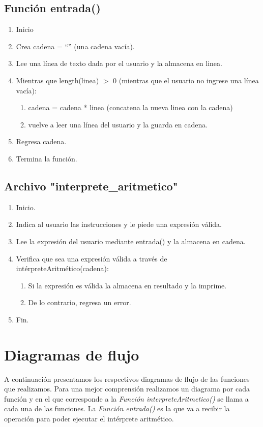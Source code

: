 \documentclass{article}
\begin{document}
\subsection{Función entrada()}
\begin{enumerate}
    \item Inicio
    \item Crea cadena  = “” (una cadena vacía).
    \item Lee una línea de texto dada por el usuario y la almacena en linea.
    \item Mientras que length(linea) $>$ 0    (mientras que el usuario no ingrese una línea vacía):
    \begin{enumerate}
        \item cadena  = cadena * linea  (concatena la nueva linea con la cadena)
        \item vuelve a leer una línea del usuario y la guarda en cadena.
    \end{enumerate}
    \item Regresa cadena.
    \item Termina la función.
\end{enumerate}

\subsection{Archivo "interprete\_aritmetico"}
\begin{enumerate}
    \item Inicio.
    \item Indica al usuario las instrucciones y le piede una expresión válida.
    \item Lee la expresión del usuario mediante entrada() y la almacena en cadena.
    \item Verifica que sea una expresión válida a través de intérpreteAritmético(cadena):
    \begin{enumerate}
        \item Si la expresión es válida la almacena en resultado y la imprime.
        \item De lo contrario, regresa un error.
    \end{enumerate}
    \item Fin.
\end{enumerate}

\pagebreak
\section{Diagramas de flujo}
\normalsize A continuación presentamos los respectivos diagramas de flujo de las funciones que realizamos. Para una mejor comprensión realizamos un diagrama por cada función y en el que corresponde a  la \textit{Función interpreteAritmetico()} se llama a cada una de las funciones. La \textit{Función entrada()} es la que va a recibir la operación para poder ejecutar el intérprete aritmético.
\end{document}
